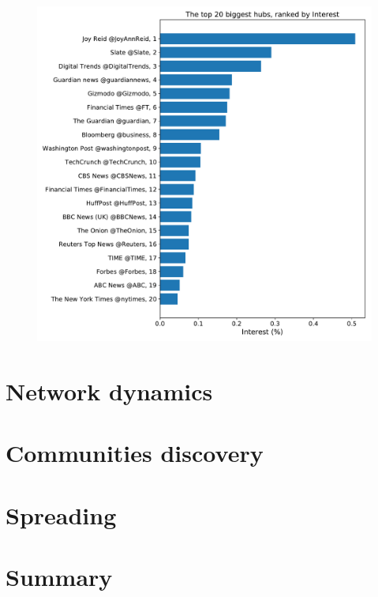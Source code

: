 \documentclass[12pt, twoside]{report}
\begin{document}
    \begin{figure}[htbp]
      \centering
      \includegraphics[width=\textwidth]{../../scripts/visualization/imgs/hubs_interest.pdf}            
      \caption{}
    \end{figure}
    

    
    \chapter{Network dynamics}

    \chapter{Communities discovery}

    \chapter{Spreading}
    

    \chapter{Summary}


\printbibliography[title={References}]
\end{document}
